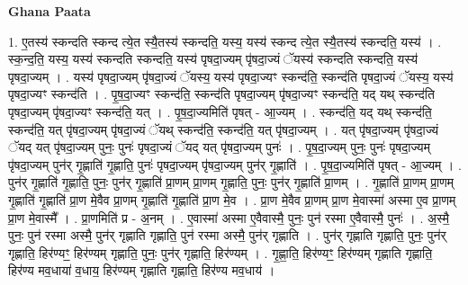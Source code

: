 \documentclass[17pt]{extarticle}
\begin{document}
\textbf{Ghana Paata } \newline

1. ए॒तस्य॑ स्कन्दति स्कन्द त्ये॒त स्यै॒तस्य॑ स्कन्दति॒ यस्य॒ यस्य॑ स्कन्द त्ये॒त स्यै॒तस्य॑ स्कन्दति॒ यस्य॑ । . स्क॒न्द॒ति॒ यस्य॒ यस्य॑ स्कन्दति स्कन्दति॒ यस्य॑ पृषदा॒ज्यम् पृ॑षदा॒ज्यं ॅयस्य॑ स्कन्दति स्कन्दति॒ यस्य॑ पृषदा॒ज्यम् । . यस्य॑ पृषदा॒ज्यम् पृ॑षदा॒ज्यं ॅयस्य॒ यस्य॑ पृषदा॒ज्यꣳ स्कन्द॑ति॒ स्कन्द॑ति पृषदा॒ज्यं ॅयस्य॒ यस्य॑ पृषदा॒ज्यꣳ स्कन्द॑ति । . पृ॒ष॒दा॒ज्यꣳ स्कन्द॑ति॒ स्कन्द॑ति पृषदा॒ज्यम् पृ॑षदा॒ज्यꣳ स्कन्द॑ति॒ यद् यथ् स्कन्द॑ति पृषदा॒ज्यम् पृ॑षदा॒ज्यꣳ स्कन्द॑ति॒ यत् । . पृ॒ष॒दा॒ज्यमिति॑ पृषत् - आ॒ज्यम् । . स्कन्द॑ति॒ यद् यथ् स्कन्द॑ति॒ स्कन्द॑ति॒ यत् पृ॑षदा॒ज्यम् पृ॑षदा॒ज्यं ॅयथ् स्कन्द॑ति॒ स्कन्द॑ति॒ यत् पृ॑षदा॒ज्यम् । . यत् पृ॑षदा॒ज्यम् पृ॑षदा॒ज्यं ॅयद् यत् पृ॑षदा॒ज्यम् पुनः॒ पुनः॑ पृषदा॒ज्यं ॅयद् यत् पृ॑षदा॒ज्यम् पुनः॑ । . पृ॒ष॒दा॒ज्यम् पुनः॒ पुनः॑ पृषदा॒ज्यम् पृ॑षदा॒ज्यम् पुन॑र् गृ॒ह्णाति॑ गृ॒ह्णाति॒ पुनः॑ पृषदा॒ज्यम् पृ॑षदा॒ज्यम् पुन॑र् गृ॒ह्णाति॑ । . पृ॒ष॒दा॒ज्यमिति॑ पृषत् - आ॒ज्यम् । . पुन॑र् गृ॒ह्णाति॑ गृ॒ह्णाति॒ पुनः॒ पुन॑र् गृ॒ह्णाति॑ प्रा॒णम् प्रा॒णम् गृ॒ह्णाति॒ पुनः॒ पुन॑र् गृ॒ह्णाति॑ प्रा॒णम् । . गृ॒ह्णाति॑ प्रा॒णम् प्रा॒णम् गृ॒ह्णाति॑ गृ॒ह्णाति॑ प्रा॒ण मे॒वैव प्रा॒णम् गृ॒ह्णाति॑ गृ॒ह्णाति॑ प्रा॒ण मे॒व । . प्रा॒ण मे॒वैव प्रा॒णम् प्रा॒ण मे॒वास्मा॑ अस्मा ए॒व प्रा॒णम् प्रा॒ण मे॒वास्मै᳚ । . प्रा॒णमिति॑ प्र - अ॒नम् । . ए॒वास्मा॑ अस्मा ए॒वैवास्मै॒ पुनः॒ पुन॑ रस्मा ए॒वैवास्मै॒ पुनः॑ । . अ॒स्मै॒ पुनः॒ पुन॑ रस्मा अस्मै॒ पुन॑र् गृह्णाति गृह्णाति॒ पुन॑ रस्मा अस्मै॒ पुन॑र् गृह्णाति । . पुन॑र् गृह्णाति गृह्णाति॒ पुनः॒ पुन॑र् गृह्णाति॒ हिर॑ण्यꣳ॒॒ हिर॑ण्यम् गृह्णाति॒ पुनः॒ पुन॑र् गृह्णाति॒ हिर॑ण्यम् । . गृ॒ह्णा॒ति॒ हिर॑ण्यꣳ॒॒ हिर॑ण्यम् गृह्णाति गृह्णाति॒ हिर॑ण्य मव॒धाया॑ व॒धाय॒ हिर॑ण्यम् गृह्णाति गृह्णाति॒ हिर॑ण्य मव॒धाय॑ । \newline
\end{document}
